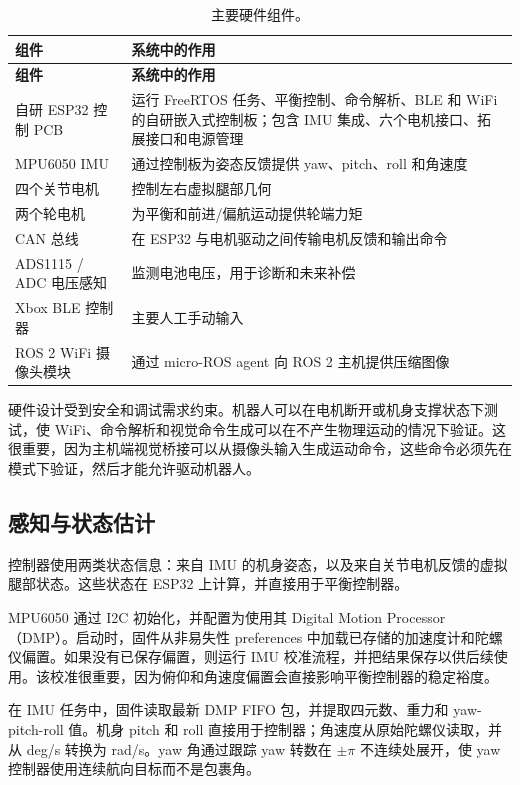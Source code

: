 \documentclass[12pt, a4paper]{article}
\begin{document}
\begingroup
\singlespacing
\small
\setlength{\tabcolsep}{2pt}
\renewcommand{\arraystretch}{1.15}
\begin{longtable}{>{\RaggedRight\arraybackslash}p{}>{\RaggedRight\arraybackslash}p{}}
\caption{主要硬件组件。}\\
\toprule
\textbf{组件} & \textbf{系统中的作用} \\
\midrule
\endfirsthead
\toprule
\textbf{组件} & \textbf{系统中的作用} \\
\midrule
\endhead
自研 ESP32 控制 PCB & 运行 FreeRTOS 任务、平衡控制、命令解析、BLE 和 WiFi 的自研嵌入式控制板；包含 IMU 集成、六个电机接口、拓展接口和电源管理 \\
MPU6050 IMU & 通过控制板为姿态反馈提供 yaw、pitch、roll 和角速度 \\
四个关节电机 & 控制左右虚拟腿部几何 \\
两个轮电机 & 为平衡和前进/偏航运动提供轮端力矩 \\
CAN 总线 & 在 ESP32 与电机驱动之间传输电机反馈和输出命令 \\
ADS1115 / ADC 电压感知 & 监测电池电压，用于诊断和未来补偿 \\
Xbox BLE 控制器 & 主要人工手动输入 \\
ROS 2 WiFi 摄像头模块 & 通过 micro-ROS agent 向 ROS 2 主机提供压缩图像 \\
\bottomrule
\end{longtable}
\endgroup

硬件设计受到安全和调试需求约束。机器人可以在电机断开或机身支撑状态下测试，使 WiFi、命令解析和视觉命令生成可以在不产生物理运动的情况下验证。这很重要，因为主机端视觉桥接可以从摄像头输入生成运动命令，这些命令必须先在 \texttt{} 模式下验证，然后才能允许驱动机器人。

\subsection{感知与状态估计}

控制器使用两类状态信息：来自 IMU 的机身姿态，以及来自关节电机反馈的虚拟腿部状态。这些状态在 ESP32 上计算，并直接用于平衡控制器。

MPU6050 通过 I2C 初始化，并配置为使用其 Digital Motion Processor（DMP）。启动时，固件从非易失性 preferences 中加载已存储的加速度计和陀螺仪偏置。如果没有已保存偏置，则运行 IMU 校准流程，并把结果保存以供后续使用。该校准很重要，因为俯仰和角速度偏置会直接影响平衡控制器的稳定裕度。

在 IMU 任务中，固件读取最新 DMP FIFO 包，并提取四元数、重力和 yaw-pitch-roll 值。机身 pitch 和 roll 直接用于控制器；角速度从原始陀螺仪读取，并从 deg/s 转换为 rad/s。yaw 角通过跟踪 yaw 转数在 \( \pm \pi \) 不连续处展开，使 yaw 控制器使用连续航向目标而不是包裹角。
\end{document}
